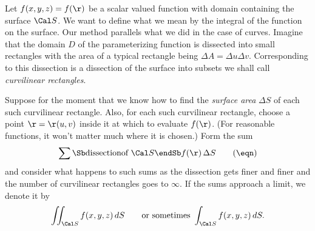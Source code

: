 Let $f(x,y,z) = f(\r)$ be a scalar valued function with
domain containing the surface $\Cal S$.   We want to define
what we mean by the integral of the function on the surface.
Our method parallels what we did in the case of curves.  Imagine
that the domain $D$ of the parameterizing function is dissected into
small rectangles with the area of a typical rectangle being
$\Delta A = \Delta u \Delta v$.   Corresponding to this dissection
is a dissection of the surface into subsets we shall call
{\it curvilinear rectangles}. 
\medskip
\centerline{}
\medskip
  Suppose for the moment that we
know how to find the {\it surface area\/} $\Delta S$ of each such 
curvilinear rectangle.   Also, for each such curvilinear
rectangle, choose a point 
 $\r = \r(u,v)$ inside it at which to evaluate $f(\r)$. 
 (For reasonable functions, it won't matter
much where it is chosen.)
  Form the
sum
\nexteqn
\xdef\SumEq{\eqn}
$$
\sum\Sb\text{dissection}\\ \text{of } \Cal S\endSb f(\r)\,\Delta S \tag\eqn
$$
and consider what happens to such sums as the dissection gets finer and
finer and the number of curvilinear rectangles goes to $\infty$.
If the sums approach a limit,  we denote it by
$$
    \iint_{\Cal S} f(x,y,z)\, dS\qquad\text{or sometimes }
    \int_{\Cal S} f(x,y,z)\, dS.
$$
%
%

